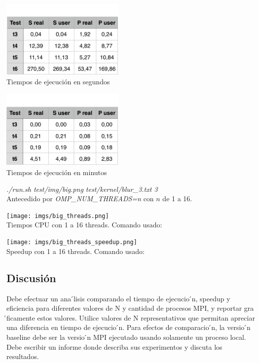 \documentclass[10pt]{extarticle}
\begin{document}
\begin{center}
 \includegraphics[width=6cm]{imgs/table_seconds.png}\\
 \footnotesize{Tiempos de ejecución en segundos}\\
\end{center}

\begin{center}
 \includegraphics[width=6cm]{imgs/table_minutes.png}\\
 \footnotesize{Tiempos de ejecución en minutos}\\
\end{center}



\textit{./run.sh test/img/big.png test/kernel/blur\_3.txt 3}\\

Antecedido por \textit{OMP\_NUM\_THREADS=n} con $n$ de 1 a 16.\\

\begin{center}
 \texttt{[image: imgs/big\_threads.png]}\\
 \footnotesize{Tiempos CPU con 1 a 16 threads. Comando usado:}\\
\end{center}


\begin{center}
 \texttt{[image: imgs/big\_threads\_speedup.png]}\\
 \footnotesize{Speedup con 1 a 16 threads. Comando usado:}\\
\end{center}

\subsection*{Discusión}
Debe efectuar un ana ́lisis comparando el tiempo de ejecucio ́n, speedup y eficiencia para diferentes valores de N y cantidad de procesos MPI, y reportar gra ́ficamente estos valores. Utilice valores de N representativos que permitan apreciar una diferencia en tiempo de ejecucio ́n.
Para efectos de comparacio ́n, la versio ́n baseline debe ser la versio ́n MPI ejecutado usando solamente un proceso local.
Debe escribir un informe donde describa sus experimentos y discuta los resultados.
\end{document}
